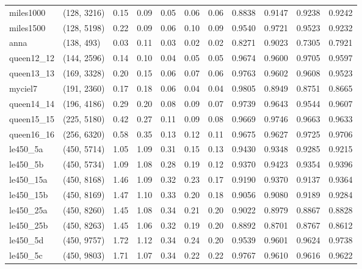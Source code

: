 \begin{tabular}{llrrrrrrrrr}
 miles1000 &  (128, 3216) &  0.15 & 0.09 & 0.05 &  0.06 &   0.06 &   0.8838 &   0.9147 &     0.9238 &      0.9242 \\
 miles1500 &  (128, 5198) &  0.22 & 0.09 & 0.06 &  0.10 &   0.09 &   0.9540 &   0.9721 &     0.9523 &      0.9232 \\
      anna &   (138, 493) &  0.03 & 0.11 & 0.03 &  0.02 &   0.02 &   0.8271 &   0.9023 &     0.7305 &      0.7921 \\
queen12\_12 &  (144, 2596) &  0.14 & 0.10 & 0.04 &  0.05 &   0.05 &   0.9674 &   0.9600 &     0.9705 &      0.9597 \\
queen13\_13 &  (169, 3328) &  0.20 & 0.15 & 0.06 &  0.07 &   0.06 &   0.9763 &   0.9602 &     0.9608 &      0.9523 \\
   myciel7 &  (191, 2360) &  0.17 & 0.18 & 0.06 &  0.04 &   0.04 &   0.9805 &   0.8949 &     0.8751 &      0.8665 \\
queen14\_14 &  (196, 4186) &  0.29 & 0.20 & 0.08 &  0.09 &   0.07 &   0.9739 &   0.9643 &     0.9544 &      0.9607 \\
queen15\_15 &  (225, 5180) &  0.42 & 0.27 & 0.11 &  0.09 &   0.08 &   0.9669 &   0.9746 &     0.9663 &      0.9633 \\
queen16\_16 &  (256, 6320) &  0.58 & 0.35 & 0.13 &  0.12 &   0.11 &   0.9675 &   0.9627 &     0.9725 &      0.9706 \\
  le450\_5a &  (450, 5714) &  1.05 & 1.09 & 0.31 &  0.15 &   0.13 &   0.9430 &   0.9348 &     0.9285 &      0.9215 \\
  le450\_5b &  (450, 5734) &  1.09 & 1.08 & 0.28 &  0.19 &   0.12 &   0.9370 &   0.9423 &     0.9354 &      0.9396 \\
 le450\_15a &  (450, 8168) &  1.46 & 1.09 & 0.32 &  0.23 &   0.17 &   0.9190 &   0.9370 &     0.9137 &      0.9364 \\
 le450\_15b &  (450, 8169) &  1.47 & 1.10 & 0.33 &  0.20 &   0.18 &   0.9056 &   0.9080 &     0.9189 &      0.9284 \\
 le450\_25a &  (450, 8260) &  1.45 & 1.08 & 0.34 &  0.21 &   0.20 &   0.9022 &   0.8979 &     0.8867 &      0.8828 \\
 le450\_25b &  (450, 8263) &  1.45 & 1.06 & 0.32 &  0.19 &   0.20 &   0.8892 &   0.8701 &     0.8767 &      0.8612 \\
  le450\_5d &  (450, 9757) &  1.72 & 1.12 & 0.34 &  0.24 &   0.20 &   0.9539 &   0.9601 &     0.9624 &      0.9738 \\
  le450\_5c &  (450, 9803) &  1.71 & 1.07 & 0.34 &  0.22 &   0.22 &   0.9767 &   0.9610 &     0.9616 &      0.9622 \\

\end{tabular}

